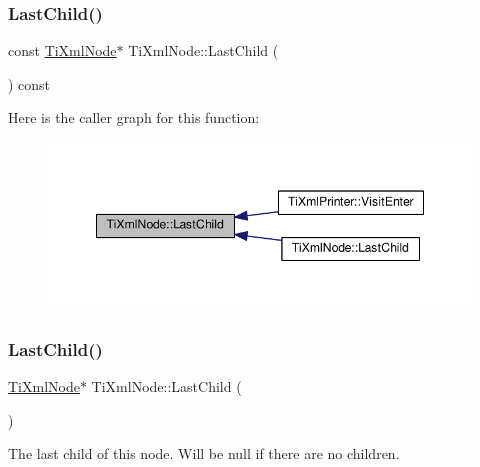 \subsubsection{\texorpdfstring{Last\+Child()}{LastChild()}\hspace{0.1cm}{\footnotesize\ttfamily [1/4]}}
{\footnotesize\ttfamily const \hyperlink{class_ti_xml_node}{Ti\+Xml\+Node}$\ast$ Ti\+Xml\+Node\+::\+Last\+Child (\begin{DoxyParamCaption}{ }\end{DoxyParamCaption}) const\hspace{0.3cm}{\ttfamily [inline]}}

Here is the caller graph for this function\+:\nopagebreak
\begin{figure}[H]
\begin{center}
\leavevmode
\includegraphics[width=348pt]{class_ti_xml_node_af3a04120b1ed2fead2f4bb72cbea845e_icgraph}
\end{center}
\end{figure}
\mbox{\label{class_ti_xml_node_a6432d2b2495f6caf9cb4278df706a031}} 
\subsubsection{\texorpdfstring{Last\+Child()}{LastChild()}\hspace{0.1cm}{\footnotesize\ttfamily [2/4]}}
{\footnotesize\ttfamily \hyperlink{class_ti_xml_node}{Ti\+Xml\+Node}$\ast$ Ti\+Xml\+Node\+::\+Last\+Child (\begin{DoxyParamCaption}{ }\end{DoxyParamCaption})\hspace{0.3cm}{\ttfamily [inline]}}



The last child of this node. Will be null if there are no children. 

